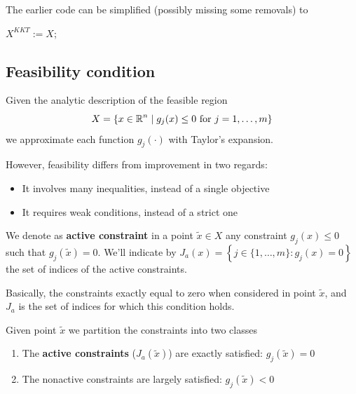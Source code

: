 The earlier code can be simplified (possibly missing some removals) to
\begin{myalgo}{0.85}
	$X^{KKT} := X$; \\
\end{myalgo}

\subsection{Feasibility condition}
\label{subsec:feasibilitycondition}

Given the analytic description of the feasible region
$$ X = \left\{x \in \operatorname{\mathbb{R}}^n \mid g_j (x) \leq 0 \text{ for } j = 1, \dots, m \right\}$$
we approximate each function $g_j(\cdot)$ with Taylor's expansion.

However, feasibility differs from improvement in two regards: 
\begin{itemize}
	\item It involves many inequalities, instead of a single objective
	
	\item It requires weak conditions, instead of a strict one \\
\end{itemize}

\begin{definition}
	We denote as \textbf{active constraint} in a point $\tilde x \in X$ any constraint $g_j (x) \leq 0$ such that $g_j (\tilde x) = 0$. We'll indicate by $J_a (x) = \left\{j \in \{1, \dots, m\}: g_j (x) = 0\right\}$ the set of indices of the active constraints.
\end{definition}

Basically, the constraints exactly equal to zero when considered in point $\tilde x$, and $J_a$ is the set of indices for which this condition holds.

Given point $\tilde x$ we partition the constraints into two classes
\begin{enumerate}
	\item The \textbf{active constraints} ($J_a (\tilde x)$) are exactly satisfied: $g_j (\tilde x) = 0$
	
	\item The nonactive constraints are largely satisfied: $g_j (\tilde x) < 0$
\end{enumerate}

